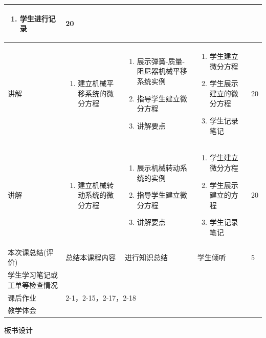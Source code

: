 {\begin{landscape}
\begin{longtable}{|m{10mm}|m{50mm}|m{50mm}|m{50mm}|m{15mm}|}
\begin{enumerate}
\item 学生进行记录
\end{enumerate} &20 \\\hline
讲解&\begin{enumerate}
\item 建立机械平移系统的微分方程
\end{enumerate}
 &\begin{enumerate}
\item 展示弹簧-质量-阻尼器机械平移系统实例
\item 指导学生建立微分方程
\item 讲解要点
\end{enumerate} &\begin{enumerate}
\item 学生建立微分方程
\item 学生展示建立的微分方程
\item 学生记录笔记
\end{enumerate} &20 \\\hline
讲解&
\begin{enumerate}
\item 建立机械转动系统的微分方程
\end{enumerate}
 &\begin{enumerate}
\item 展示机械转动系统的实例
\item 指导学生建立微分方程
\item 讲解要点
\end{enumerate} &\begin{enumerate}
\item 学生建立微分方程
\item 学生展示建立的方程
\item 学生记录笔记
\end{enumerate} &20 \\\hline
\centering 本次课总结(评价)&总结本课程内容 &进行知识总结 &学生倾听 &5 \\\hline
\centering 学生学习笔记或工单等检查情况&\multicolumn{4}{m{165mm}|}{\quad}\\\hline
\centering 课后作业&\multicolumn{4}{m{165mm}|}{2-1，2-15，2-17，2-18}\\\hline
\centering 教学体会&\multicolumn{4}{m{165mm}|}{\quad}\\
\end{longtable}

\end{landscape}
\clearpage
\begin{center}
{\huge 板书设计}
\end{center}
}

